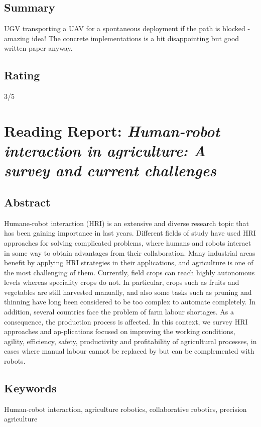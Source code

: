 \subsection*{Summary}
UGV transporting a UAV for a spontaneous deployment if the path is blocked - amazing idea! The concrete implementations is a bit disappointing but good written paper anyway.

\subsection*{Rating}
3/5


\section{Reading Report: \emph{Human-robot interaction in agriculture: A survey and current challenges}}
\cite{Vasconez2019}

\subsection*{Abstract}
Humane-robot interaction (HRI) is an extensive and diverse research topic that has been
gaining importance in last years. Different fields of study have used HRI approaches for
solving complicated problems, where humans and robots interact in some way to obtain
advantages from their collaboration. Many industrial areas benefit by applying HRI strategies in their applications, and agriculture is one of the most challenging of them.
Currently, field crops can reach highly autonomous levels whereas speciality crops do not.
In particular, crops such as fruits and vegetables are still harvested manually, and also
some tasks such as pruning and thinning have long been considered to be too complex to
automate completely. In addition, several countries face the problem of farm labour
shortages. As a consequence, the production process is affected. In this context, we survey
HRI approaches and ap-plications focused on improving the working conditions, agility,
efficiency, safety, productivity and profitability of agricultural processes, in cases where
manual labour cannot be replaced by but can be complemented with robots.

\subsection*{Keywords}
Human-robot interaction, agriculture robotics, collaborative robotics, precision agriculture


